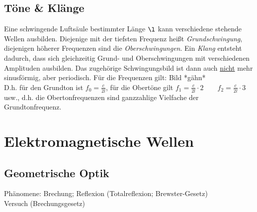 \documentclass[a4paper]{scrartcl}
\begin{document}
\subsection{Töne \& Klänge}
Eine schwingende Luftsäule bestimmter Länge \(\l\) kann verschiedene stehende
Wellen ausbilden. Diejenige mit der tiefsten Frequenz heißt
\emph{Grundschwingung}, diejenigen höherer Frequenzen sind die
\emph{Oberschwingungen}. Ein \emph{Klang} entsteht dadurch, dass sich
gleichzeitig Grund- und Oberschwingungen mit verschiedenen Amplituden
ausbilden. Das zugehörige Schwingungsbild ist dann auch \underline{nicht} mehr
sinusförmig, aber periodisch. Für die Frequenzen gilt: Bild *gähn*\\
D.h. für den Grundton ist \(f_0 = \frac{c}{2l}\), für die Obertöne gilt \(f_1 =
\frac{c}{2l} \cdot 2\qquad f_2 = \frac{c}{2l} \cdot 3\) usw., d.h. die
Obertonfrequenzen sind ganzzahlige Vielfache der Grundtonfrequenz.

\section{Elektromagnetische Wellen}
\subsection{Geometrische Optik}
Phänomene: Brechung; Reflexion (Totalreflexion; Brewster-Gesetz)\\
Versuch (Brechungsgesetz)
\end{document}
